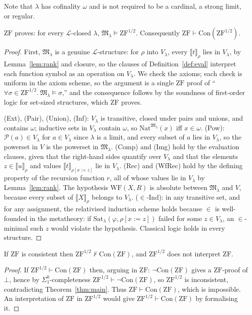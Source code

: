 \documentclass[10pt]{article}
\newcommand{\ZF}{\mathrm{ZF}}
\newcommand{\ZFh}{\mathrm{ZF}^{1/2}}
\newcommand{\Con}{\mathrm{Con}}
\newcommand{\PP}{\mathcal{P}}
\newcommand{\Sat}{\mathrm{Sat}}
\newcommand{\WF}{\mathrm{WF}}
\newcommand{\sem}[1]{\llbracket #1\rrbracket}
\newcommand{\Lang}{\mathcal L}
\newcommand{\M}{\mathfrak M}
\newcommand{\Nat}{\mathrm{Nat}}
\begin{document}
Note that $\lambda$ has cofinality $\omega$ and is not required to be a
cardinal, a strong limit, or regular.

\begin{theorem}\label{thm:main}
$\ZF$ proves: for every $\Lang$-closed $\lambda$, $\M_\lambda\models\ZFh$.
Consequently $\ZF\vdash\Con(\ZFh)$.
\end{theorem}
\begin{proof}
First, $\M_\lambda$ is a genuine $\Lang$-structure: for $\rho$ into
$V_\lambda$, every $\sem t_\rho$ lies in $V_\lambda$, by
Lemma~\ref{lem:rank} and closure, so the clauses of
Definition~\ref{def:eval} interpret each function symbol as an operation
on $V_\lambda$. We check the axioms; each check is uniform in the axiom
scheme, so the argument is a single $\ZF$ proof of
``$\forall\sigma\in\ZFh.\ \M_\lambda\models\sigma$,'' and the
consequence follows by the soundness of first-order logic for set-sized
structures, which $\ZF$ proves.

(Ext), (Pair), (Union), (Inf): $V_\lambda$ is transitive, closed under
pairs and unions, and contains $\omega$; inductive sets in $V_\lambda$
contain $\omega$, so $\Nat^{\M_\lambda}(x)$ iff $x\in\omega$.
(Pow): $\PP(a)\in V_\lambda$ for $a\in V_\lambda$ since $\lambda$ is a
limit, and every subset of $a$ lies in $V_\lambda$, so the powerset in
$V$ is the powerset in $\M_\lambda$.
(Comp) and (Img) hold by the evaluation clauses, given that the
right-hand sides quantify over $V_\lambda$ and that the elements
$z\in\sem u_\rho$ and values $\sem t_{\rho[x:=z]}$ lie in $V_\lambda$.
(Rec) and (WfRec) hold by the defining property of the recursion
function $r$, all of whose values lie in $V_\lambda$ by
Lemma~\ref{lem:rank}. The hypothesis $\WF(X,R)$ is absolute between
$\M_\lambda$ and $V$, because every subset of $\sem X_\rho$ belongs to
$V_\lambda$.
($\in$-Ind): in any transitive set, and for any assignment, the
relativised induction scheme holds because $\in$ is well-founded in the
metatheory: if $\Sat_\lambda(\varphi,\rho[x{:=}z])$ failed for some
$z\in V_\lambda$, an $\in$-minimal such $z$ would violate the hypothesis.
Classical logic holds in every structure.
\end{proof}

\begin{corollary}\label{cor:strict}
If $\ZF$ is consistent then $\ZFh\nvdash\Con(\ZF)$, and $\ZFh$ does not
interpret $\ZF$.
\end{corollary}
\begin{proof}
If $\ZFh\vdash\Con(\ZF)$ then, arguing in $\ZF$: $\neg\Con(\ZF)$ gives a
$\ZF$-proof of $\bot$, hence by $\Sigma^0_1$-completeness
$\ZFh\vdash\neg\Con(\ZF)$, so $\ZFh$ is inconsistent, contradicting
Theorem~\ref{thm:main}. Thus $\ZF\vdash\Con(\ZF)$, which is impossible.
An interpretation of $\ZF$ in $\ZFh$ would give $\ZFh\vdash\Con(\ZF)$
by formalising it.
\end{proof}
\end{document}
